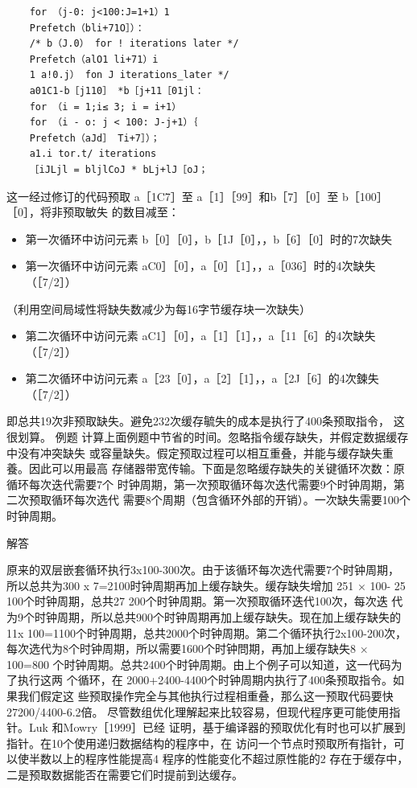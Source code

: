 \begin{verbatim}
    for （j-0: j<100:J=1+1）1
    Prefetch（bli+71O］）：
    /* b（J.0） for ! iterations later */
    Prefetch（alO1 li+71）i
    1 a!0.j） fon J iterations_later */
    a01C1-b［j110］ *b［j+11［01jl：
    for （i = 1;i≤ 3; i = i+1）
    for （i - o: j < 100: J-j+1）｛
    Prefetch（aJd］ Ti+7］）；
    a1.i tor.t/ iterations
    ［iJLjl = bljlCoJ * bLj+lJ［oJ；
\end{verbatim}
这一经过修订的代码预取 a［1C7］至 a［1］［99］和b［7］［0］至 b［100］［0］，将非预取敏失
的数目减至：
\begin{itemize}
    \item 第一次循环中访问元素 b［0］［0］，b［1J［0］，，b［6］［0］时的7次缺失
    \item 第一次循环中访问元素 aC0］［0］，a［0］［1］，，a［036］时的4次缺失（［7/2］）
\end{itemize}
（利用空间局域性将缺失数减少为每16字节缓存块一次缺失）
\begin{itemize}
    \item 第二次循环中访问元素 aC1］［0］，a［1］［1］，，a［11［6］的4次缺失（［7/2］）
    \item 第二次循环中访问元素 a［23［0］，a［2］［1］，，a［2J［6］的4次鍊失（［7/2］）
\end{itemize}
即总共19次非预取缺失。避免232次缓存毓失的成本是执行了400条预取指令，
这很划算。
例题
计算上面例题中节省的时间。忽略指令缓存缺失，并假定数据缓存中没有冲突缺失
或容量缺失。假定预取过程可以相互重叠，并能与缓存缺失重養。因此可以用最高
存储器带宽传输。下面是忽略缓存缺失的关键循环次数：原循环每次迭代需要7个
时钟周期，第一次预取循环每次迭代需要9个时钟周期，第二次预取循环每次选代
需要8个周期（包含循环外部的开销）。一次缺失需要100个时钟周期。

解答

原来的双层嵌套循环执行3x100-300次。由于该循环每次选代需要7个时钟周期，
所以总共为300 x 7=2100时钟周期再加上缓存缺失。缓存缺失增加 251 × 100-
25 100个时钟周期，总共27 200个时钟周期。第一次预取循环迭代100次，每次迭
代为9个时钟周期，所以总共900个时钟周期再加上缓存缺失。现在加上缓存缺失的
11x 100=1100个时钟周期，总共2000个时钟周期。第二个循环执行2x100-200次，
每次选代为8个时钟周期，所以需要1600个时钟問期，再加上缓存缺失8 × 100=800
个时钟周期。总共2400个时钟周期。由上个例子可以知道，这一代码为了执行这两
个循环，在 2000+2400-4400个时钟周期内执行了400条预取指令。如果我们假定这
些预取操作完全与其他执行过程相重叠，那么这一预取代码要快27200/4400-6.2倍。
尽管数组优化理解起来比较容易，但现代程序更可能使用指针。Luk 和Mowry［1999］已经
证明，基于编译器的预取优化有时也可以扩展到指针。在10个使用递归数据结构的程序中，在
访问一个节点时预取所有指针，可以使半数以上的程序性能提高4%
程序的性能变化不超过原性能的2%
存在于缓存中，二是预取数据能否在需要它们时提前到达缓存。

